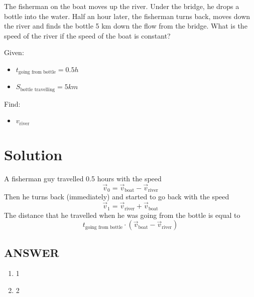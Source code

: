 The fisherman on the boat moves up the river. Under the bridge, he drops a bottle into the water.
Half an hour later, the fisherman turns back, moves down the river and finds the bottle 5 km
down the flow from the bridge. What is the speed of the river if the speed of the boat is constant?

\bigbreak Given: \begin{itemize}
    \item $t_{\text{going from bottle}} = 0.5h$
    \item $S_{\text{bottle travelling}} = 5km$
\end{itemize}

Find: \begin{itemize}
    \item $v_{\text{river}}$
\end{itemize}

\section*{Solution}

A fisherman guy travelled 0.5 hours with the speed $$\Vec{v}_0 = \Vec{v}_{\text{boat}} - \Vec{v}_{\text{river}}$$
Then he turns back (immediately) and started to go back with the speed $$\Vec{v}_1 = \Vec{v}_{\text{river}} + \Vec{v}_{\text{boat}}$$
The distance that he travelled when he was going from the bottle is equal to $$t_{\text{going from bottle}} \cdot (\Vec{v}_{\text{boat}} - \Vec{v}_{\text{river}})$$




\vfill
\subsection*{ANSWER}
\begin{enumerate}
    \item 1
    \item 2
\end{enumerate}

